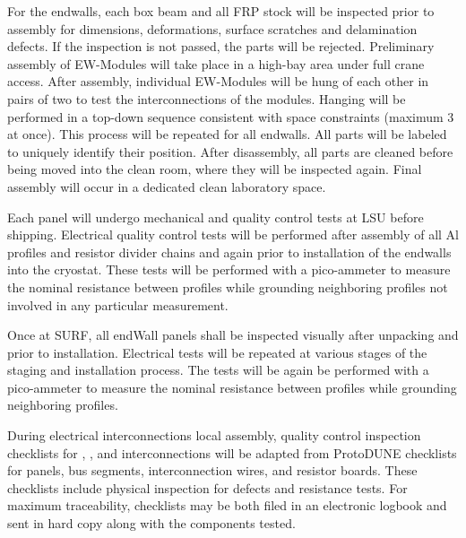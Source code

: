 For the endwalls, each box beam and all FRP stock will be inspected prior to assembly for dimensions, deformations, surface scratches and delamination defects. If the inspection is not passed, the parts will be rejected.
Preliminary assembly of EW-Modules will take place in a high-bay area under full crane access. After assembly, individual EW-Modules will be hung of each other in pairs of two to test the interconnections of the modules. Hanging will be performed in a top-down sequence consistent with space constraints (maximum 3 at once). This process will be repeated for all endwalls. All parts will be labeled to uniquely identify their position. After disassembly, all parts are cleaned before being moved into the clean room, where they will be inspected again. Final assembly will occur in a dedicated clean laboratory space.

Each panel will undergo mechanical and quality control tests at LSU before shipping. Electrical quality control tests will be performed after assembly of all Al profiles and resistor divider chains and again prior to installation of the endwalls into the cryostat. These tests will be performed with a pico-ammeter to measure the nominal resistance between profiles while grounding neighboring profiles not involved in any particular measurement.





Once at SURF, all endWall panels shall be inspected visually after unpacking and prior to installation. Electrical tests will be repeated at various stages of the staging and installation process.
The tests will be again be performed with a pico-ammeter to measure the nominal resistance between profiles while grounding neighboring profiles.

During electrical interconnections local assembly, quality control inspection checklists for , , and
interconnections will be adapted from ProtoDUNE checklists for 
panels,  bus segments, interconnection wires, and resistor boards.
These checklists include physical inspection for defects and
resistance tests.  For maximum traceability, checklists may be both
filed in an electronic logbook and sent in hard copy along with the
components tested.

